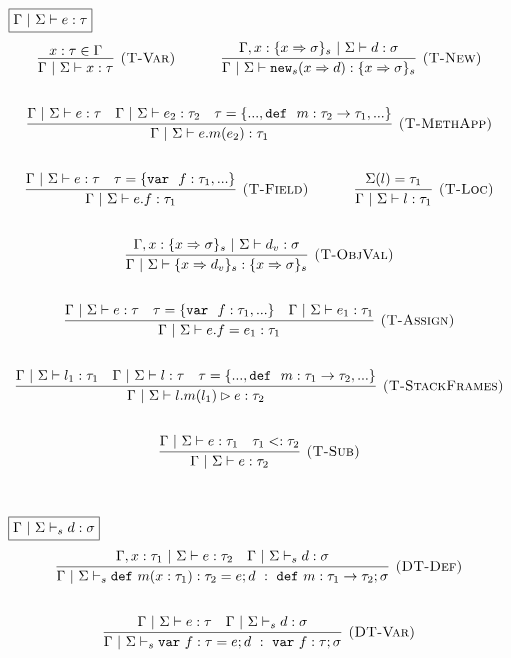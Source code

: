 \documentclass{llncs}
\newcommand{\keywadj}[1]{\mathtt{#1}}
\newcommand{\keyw}[1]{\keywadj{#1}~}
\begin{document}
$\fbox{$\Gamma~|~\Sigma \vdash e : \tau$}$
\[
\begin{array}{c}
\infer[\textsc{(T-Var)}]
  {\Gamma~|~\Sigma \vdash x : \tau}
  {x : \tau \in \Gamma}%
~~~~~~~~~~
\infer[\textsc{(T-New)}]
	{\Gamma~|~\Sigma \vdash\keywadj{new}_{s}(x \Rightarrow d) : \{ x \Rightarrow \sigma \}_{s}}
	{\Gamma, x : \{ x \Rightarrow \sigma \}_{s}~|~\Sigma \vdash d : \sigma} \\[5ex]

\infer[\textsc{(T-MethApp)}]
	{\Gamma~|~\Sigma \vdash  e.m(e_2) : \tau_1} 
	{\Gamma~|~\Sigma \vdash e : \tau & \Gamma~|~\Sigma \vdash e_2 : \tau_2 & \tau=\{..., \keyw{def}~ m : \tau_2 \rightarrow \tau_1, ... \} }\\[5ex]

\infer[\textsc{(T-Field)}]
	{\Gamma~|~\Sigma \vdash  e.f : \tau_1} 
	{\Gamma~|~\Sigma \vdash e : \tau & \tau= \{\keyw{var}~ f : \tau_1,... \} }%
~~~~~~~~~~
\infer[\textsc{(T-Loc)}]
  {\Gamma~|~\Sigma \vdash l : \tau_1}
  {\Sigma(l) = \tau_1}\\[5ex]

\infer[\textsc{(T-ObjVal)}]
  {\Gamma~|~\Sigma \vdash \{ x \Rightarrow d_v \}_{s} : \{ x \Rightarrow \sigma \}_{s}}
  {\Gamma, x : \{ x \Rightarrow \sigma \}_{s}~|~\Sigma \vdash d_v : \sigma}\\[5ex]

\infer[\textsc{(T-Assign)}]
	{\Gamma~|~\Sigma \vdash  e.f=e_1 : \tau_1} 
	{\Gamma~|~\Sigma \vdash e : \tau & \tau = \{\keyw{var}~ f:\tau_1,... \} & \Gamma~|~\Sigma \vdash e_1 : \tau_1 }\\[5ex]

\infer[\textsc{(T-StackFrames)}]
	{\Gamma~|~\Sigma \vdash l.m(l_1) \rhd e : \tau_2}
	{\Gamma~|~\Sigma \vdash l_1 : \tau_1 & \Gamma~|~\Sigma \vdash l : \tau & \tau = \{..., \keyw{def}~ m : \tau_1 \rightarrow \tau_2, ... \}} \\[5ex]

\infer[\textsc{(T-Sub)}]
  {\Gamma~|~\Sigma \vdash e : \tau_2}
  {\Gamma~|~\Sigma \vdash e : \tau_1 & \tau_1 <: \tau_2}\\[5ex]

\end{array}
\]

$\fbox{$\Gamma~|~\Sigma \vdash_s d : \sigma$}$
\[
\begin{array}{c}
\infer[\textsc{(DT-Def)}]
  {\Gamma~|~\Sigma \vdash_s \keyw{def} m(x : \tau_1) : \tau_2 = e; d~:~\keyw{def} m : \tau_1 \rightarrow \tau_2; \sigma}
  {\Gamma, x : \tau_1~|~\Sigma \vdash e : \tau_2 & \Gamma~|~\Sigma \vdash_s d : \sigma}\\[5ex]

\infer[\textsc{(DT-Var)}]
  {\Gamma~|~\Sigma \vdash_s \keyw{var} f : \tau = e; d~:~\keyw{var} f : \tau; \sigma}
  {\Gamma~|~\Sigma \vdash e : \tau & \Gamma~|~\Sigma \vdash_s d : \sigma}\\[5ex]

\end{array}
\]
\end{document}
